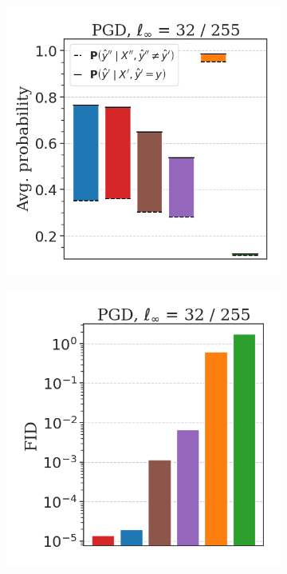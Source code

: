 \begin{figure}[H]
    \centering
    \begin{subfigure}[b]{0.3\textwidth}
        \centering
        \includegraphics[width=\textwidth]{img/results_discussion/adversarial/DIFF_PGD_0.1255.png}
    \end{subfigure}
    \hfill
    \begin{subfigure}[b]{0.3\textwidth}
        \centering
        \includegraphics[width=\textwidth]{img/results_discussion/adversarial/FID_barplot_0.1255.png}

\end{subfigure}
\end{figure}
